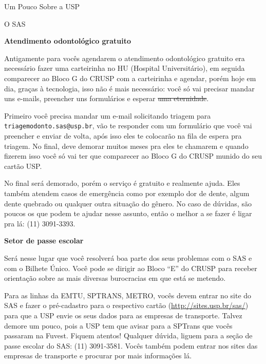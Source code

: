 \begin{secao}{Um Pouco Sobre a USP}
\begin{subsecao}{O SAS}



\textbf{Atendimento odontológico gratuito}

Antigamente para vocês agendarem o atendimento odontológico gratuito era necessário fazer uma
carteirinha no HU (Hospital Universitário), em seguida comparecer ao Bloco G
do CRUSP com a carteirinha e agendar, porém hoje em dia, graças à tecnologia,
isso não é mais necessário: você só vai precisar mandar uns e-mails, preencher uns
formulários e esperar \sout{uma eternidade}.

Primeiro você precisa mandar um e-mail solicitando triagem para {\tt triagemodonto.sas@usp.br},
vão te responder com um formulário que você vai preencher e enviar de volta, após isso eles
te colocarão na fila de espera pra triagem. No final, deve demorar muitos meses pra
eles te chamarem e quando fizerem isso você só vai ter que comparecer ao Bloco G do CRUSP
munido do seu cartão USP.

No final será demorado, porém o serviço é gratuito e realmente ajuda. Eles também atendem casos
de emergência como por exemplo dor de dente, algum dente quebrado ou qualquer outra situação
do gênero. No caso de dúvidas, são poucos os que podem te ajudar nesse assunto, então o melhor
a se fazer é ligar pra lá: (11) 3091-3393.

\textbf{Setor de passe escolar}

Será nesse lugar que você resolverá boa parte dos seus problemas com o SAS e com o
Bilhete Único. Você pode se dirigir ao Bloco “E” do CRUSP para receber orientação sobre
as mais diversas burocracias em que está se metendo.

Para as linhas da EMTU, SPTRANS, METRO, vocês devem entrar no site do SAS e fazer
o pré-cadastro para o respectivo cartão (\url {http://sites.usp.br/sas/}) para que a USP envie os 
seus dados para as empresas de transporte. Talvez demore um pouco, pois a USP tem que
avisar para a SPTrans que vocês passaram na Fuvest. Fiquem atentos! Qualquer dúvida,
liguem para a seção de passe escolar do SAS: (11) 3091-3581. Vocês também podem entrar nos sites 
das empresas de transporte e procurar por mais informações lá.


\end{subsecao}
\end{secao}

